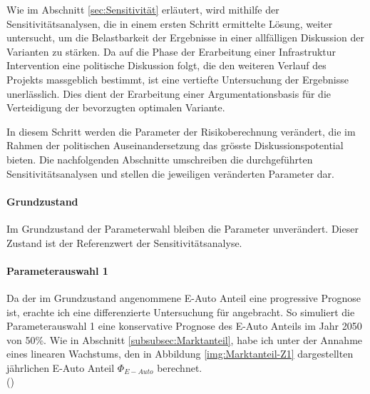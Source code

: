 %
%
%
%

\label{subsec:Sensitivitätsanalyse}

Wie im Abschnitt \ref{sec:Sensitivität} erläutert, wird mithilfe der Sensitivitätsanalysen, die in einem ersten Schritt ermittelte Lösung, weiter untersucht, um die Belastbarkeit der Ergebnisse in einer allfälligen Diskussion der Varianten zu stärken. Da auf die Phase der Erarbeitung einer Infrastruktur Intervention eine politische Diskussion folgt, die den weiteren Verlauf des Projekts massgeblich bestimmt, ist eine vertiefte Untersuchung der Ergebnisse unerlässlich. Dies dient der Erarbeitung einer Argumentationsbasis für die Verteidigung der bevorzugten optimalen Variante.

In diesem Schritt werden die Parameter der Risikoberechnung verändert, die im Rahmen der politischen Auseinandersetzung das grösste Diskussionspotential bieten.
Die nachfolgenden Abschnitte umschreiben die durchgeführten Sensitivitätsanalysen und stellen die jeweiligen veränderten Parameter dar.

\paragraph{Grundzustand} Im Grundzustand der Parameterwahl bleiben die Parameter unverändert. Dieser Zustand ist der Referenzwert der Sensitivitätsanalyse.

\paragraph{Parameterauswahl 1} Da der im Grundzustand angenommene E-Auto Anteil eine progressive Prognose ist, erachte ich eine differenzierte Untersuchung für angebracht. So simuliert die Parameterauswahl 1 eine konservative Prognose des E-Auto Anteils im Jahr 2050 von 50\%. Wie in Abschnitt \ref{subsubsec:Marktanteil}, habe ich unter der Annahme eines linearen Wachstums, den in Abbildung \ref{img:Marktanteil-Z1} dargestellten jährlichen E-Auto Anteil \( \Phi_{E-Auto} \) berechnet. \\ (\cite{Bestand2019})


